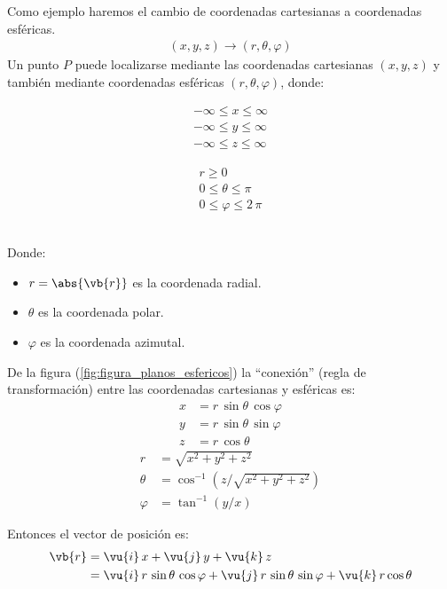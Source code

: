 Como ejemplo haremos el cambio de coordenadas cartesianas a coordenadas esféricas.
\begin{align*}
(x, y, z) \longrightarrow (r, \theta, \varphi)
\end{align*}
Un punto $P$ puede localizarse mediante las coordenadas cartesianas $(x, y, z)$ y también mediante coordenadas esféricas $(r, \theta, \varphi)$, donde:
\\[0.5em]
\begin{minipage}{0.4\linewidth}
\begin{align*}
-\infty \le x \le \infty \\
-\infty \le y \le \infty \\
-\infty \le z \le \infty
\end{align*}
\end{minipage}
\hspace{2cm}
\begin{minipage}{0.4\linewidth}
\begin{align*}
r \geq 0 \\
0 \le \theta \le \pi \\
0 \le \varphi \le 2 \, \pi
\end{align*}
\end{minipage}
\\[0.5em]
Donde:
\begin{itemize}
\item $r = \abs{\vb{r}}$ es la coordenada radial.
\item $\theta$ es la coordenada polar.
\item $\varphi$ es la coordenada azimutal.
\end{itemize}

De la figura (\ref{fig:figura_planos_esfericos}) la \enquote{conexión} (regla de transformación)  entre las coordenadas cartesianas y esféricas es:
\begin{align*}
x &= r \, \sin \theta \, \cos \varphi \\
y &= r \, \sin \theta \, \sin \varphi \\
z &= r \, \cos \theta
\end{align*}
\begin{align*}
r &= \sqrt{x^{2} + y^{2} + z^{2}} \\
\theta &= \cos^{-1} \left( z / \sqrt{x^{2} + y^{2} + z^{2}} \right) \\
\varphi &= \tan^{-1} (y/x)
\end{align*}

Entonces el vector de posición es:
\begin{align}
\begin{aligned}
\vb{r} &= \vu{i} \, x + \vu{j} \, y + \vu{k} \, z \\
&= \vu{i} \, r \, \sin \theta \, \cos \varphi + \vu{j} \, r \, \sin \theta \, \sin \varphi + \vu{k} \, r \cos \theta 
\end{aligned}
\label{eq:ecuacion_01_06}
\end{align}

